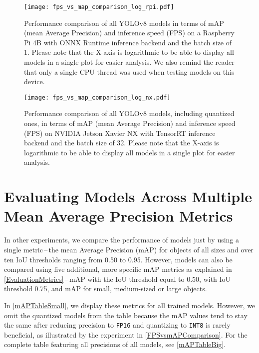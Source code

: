 \begin{figure}[H]
    \begin{framed}
        \centering
        \texttt{[image: fps\_vs\_map\_comparison\_log\_rpi.pdf]}
        \caption{Performance comparison of all YOLOv8 models in terms of mAP
        (mean Average Precision) and inference speed (FPS) on a Raspberry Pi 4B
        with ONNX Runtime inference backend and the batch size of 1. Please note
        that the X-axis is logarithmic to be able to display all models in a
        single plot for easier analysis. We also remind the reader that only a
        single CPU thread was used when testing models on this device.}
        \label{FPSvsmAPComparisonRPi}
    \end{framed}
\end{figure}

\begin{figure}[H]
    \begin{framed}
        \centering
        \texttt{[image: fps\_vs\_map\_comparison\_log\_nx.pdf]}
        \caption{Performance comparison of all YOLOv8 models, including
        quantized ones, in terms of mAP (mean Average Precision) and inference
        speed (FPS) on NVIDIA Jetson Xavier NX with TensorRT inference backend
        and the batch size of 32. Please note that the X-axis is logarithmic to
        be able to display all models in a single plot for easier analysis.}
        \label{FPSvsmAPComparisonNX}
    \end{framed}
\end{figure}








\section{Evaluating Models Across Multiple Mean Average Precision Metrics}

In other experiments, we compare the performance of models just by
using a single metric\,--\,the mean Average Precision (mAP) for objects of all
sizes and over ten IoU thresholds ranging from \num{0.50} to \num{0.95}.
However, models can also be compared using five additional, more specific mAP
metrics as explained in \autoref{EvaluationMetrics}\,--\,mAP with the IoU
threshold equal to \num{0.50}, with IoU threshold \num{0.75}, and mAP for small,
medium-sized or large objects.

In \autoref{mAPTableSmall}, we display these metrics for all trained models.
However, we omit the quantized models from the table because the mAP values tend
to stay the same after reducing precision to \texttt{FP16} and quantizing to
\texttt{INT8} is rarely beneficial, as illustrated by the experiment in
\autoref{FPSvsmAPComparison}. For the complete table featuring all precisions of
all models, see \autoref{mAPTableBig}.


